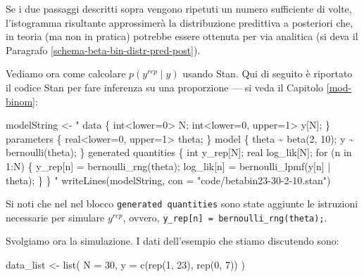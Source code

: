 \documentclass[
  11pt,
  italian,
  a4paper,
  extrafontsizes,onecolumn,openright
  ]{memoir}
\newenvironment{Shaded}{\begin{snugshade}}{\end{snugshade}}
\newcommand{\AttributeTok}[1]{\textcolor[rgb]{0.77,0.63,0.00}{#1}}
\newcommand{\DecValTok}[1]{\textcolor[rgb]{0.00,0.00,0.81}{#1}}
\newcommand{\FunctionTok}[1]{\textcolor[rgb]{0.00,0.00,0.00}{#1}}
\newcommand{\NormalTok}[1]{#1}
\newcommand{\OtherTok}[1]{\textcolor[rgb]{0.56,0.35,0.01}{#1}}
\newcommand{\StringTok}[1]{\textcolor[rgb]{0.31,0.60,0.02}{#1}}
\theoremstyle{definition}
\theoremstyle{definition}
\theoremstyle{definition}
\theoremstyle{definition}
\theoremstyle{remark}
\begin{document}
Se i due passaggi descritti sopra vengono ripetuti un numero sufficiente di volte, l'istogramma risultante approssimerà la distribuzione predittiva a posteriori che, in teoria (ma non in pratica) potrebbe essere ottenuta per via analitica (si deva il Paragrafo \ref{schema-beta-bin-distr-pred-post}).

Vediamo ora come calcolare \(p(y^{rep} \mid y)\) usando Stan. Qui di seguito è riportato il codice Stan per fare inferenza su una proporzione --- si veda il Capitolo \ref{mod-binom}:

\begin{Shaded}
\begin{Highlighting}[]
\NormalTok{modelString }\OtherTok{\textless{}{-}} \StringTok{"}
\StringTok{data \{}
\StringTok{  int\textless{}lower=0\textgreater{} N;}
\StringTok{  int\textless{}lower=0, upper=1\textgreater{} y[N];}
\StringTok{\}}
\StringTok{parameters \{}
\StringTok{  real\textless{}lower=0, upper=1\textgreater{} theta;}
\StringTok{\}}
\StringTok{model \{}
\StringTok{  theta \textasciitilde{} beta(2, 10);}
\StringTok{  y \textasciitilde{} bernoulli(theta);}
\StringTok{\}}
\StringTok{generated quantities \{}
\StringTok{  int y\_rep[N];}
\StringTok{  real log\_lik[N];}
\StringTok{  for (n in 1:N) \{}
\StringTok{    y\_rep[n] = bernoulli\_rng(theta);}
\StringTok{    log\_lik[n] = bernoulli\_lpmf(y[n] | theta);}
\StringTok{  \}}
\StringTok{\}}
\StringTok{"}
\FunctionTok{writeLines}\NormalTok{(modelString, }\AttributeTok{con =} \StringTok{"code/betabin23{-}30{-}2{-}10.stan"}\NormalTok{)}
\end{Highlighting}
\end{Shaded}

Si noti che nel nel blocco \texttt{generated\ quantities} sono state aggiunte le istruzioni necessarie per simulare \(y^{rep}\), ovvero, \texttt{y\_rep{[}n{]}\ =\ bernoulli\_rng(theta);}.

Svolgiamo ora la simulazione. I dati dell'esempio che stiamo discutendo sono:

\begin{Shaded}
\begin{Highlighting}[]
\NormalTok{data\_list }\OtherTok{\textless{}{-}} \FunctionTok{list}\NormalTok{(}
  \AttributeTok{N =} \DecValTok{30}\NormalTok{,}
  \AttributeTok{y =} \FunctionTok{c}\NormalTok{(}\FunctionTok{rep}\NormalTok{(}\DecValTok{1}\NormalTok{, }\DecValTok{23}\NormalTok{), }\FunctionTok{rep}\NormalTok{(}\DecValTok{0}\NormalTok{, }\DecValTok{7}\NormalTok{))}
\NormalTok{)}
\end{Highlighting}
\end{Shaded}
\end{document}
